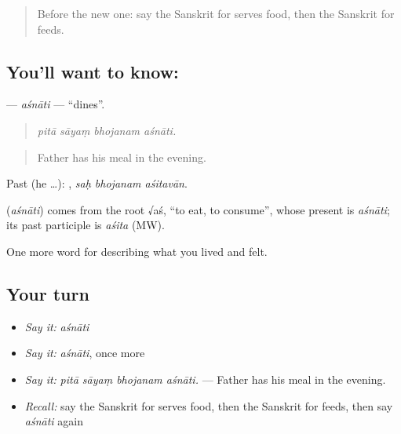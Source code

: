 \begin{quote}
Before the new one: say the Sanskrit for serves food, then the Sanskrit for feeds.
\end{quote}

\subsection*{You'll want to know: }
\textbf{} — \emph{aśnāti} — \textquotedblleft{}dines\textquotedblright{}.

\begin{quote}
   
\end{quote}

\begin{quote}
\emph{pitā sāyaṃ bhojanam aśnāti.}
\end{quote}

\begin{quote}
Father has his meal in the evening.
\end{quote}

Past (he …):   , \emph{saḥ bhojanam aśitavān}.

\begin{cousinweb}
\textbf{} (\emph{aśnāti}) comes from the root √aś, \textquotedblleft{}to eat, to consume\textquotedblright{}, whose present is \emph{aśnāti}; its past participle is \emph{aśita} (MW).
\end{cousinweb}

\begin{grammarlens}[title={What you've built}]
One more word for describing what you lived and felt.
\end{grammarlens}

\subsection*{Your turn}
\begin{itemize}
\raggedright
  \item \emph{Say it:} \emph{aśnāti}
  \item \emph{Say it:} \emph{aśnāti}, once more
  \item \emph{Say it:} \emph{pitā sāyaṃ bhojanam aśnāti.} — Father has his meal in the evening.
  \item \emph{Recall:} say the Sanskrit for serves food, then the Sanskrit for feeds, then say \emph{aśnāti} again
\end{itemize}

